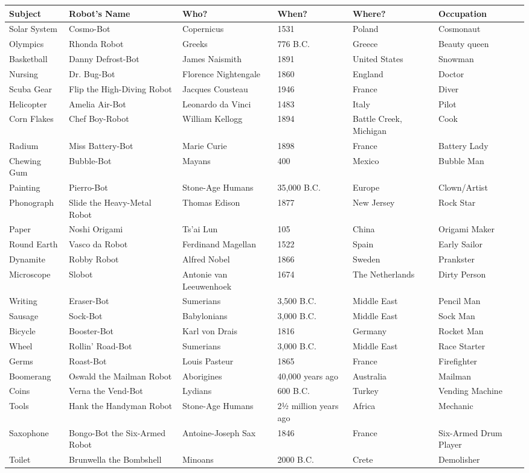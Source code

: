 \documentclass{article}
\begin{document}
\begin{tabular}{llllll}
\toprule
Subject & Robot's Name & Who? & When? & Where? & Occupation \\
\midrule
Solar System & Cosmo-Bot & Copernicus & 1531 & Poland & Cosmonaut \\
Olympics & Rhonda Robot & Greeks & 776 B.C. & Greece & Beauty queen \\
Basketball & Danny Defrost-Bot & James Naismith & 1891 & United States & Snowman \\
Nursing & Dr. Bug-Bot & Florence Nightengale & 1860 & England & Doctor \\
Scuba Gear & Flip the High-Diving Robot & Jacques Cousteau & 1946 & France & Diver \\
Helicopter & Amelia Air-Bot & Leonardo da Vinci & 1483 & Italy & Pilot \\
Corn Flakes & Chef Boy-Robot & William Kellogg & 1894 & Battle Creek, Michigan & Cook \\
Radium & Miss Battery-Bot & Marie Curie & 1898 & France & Battery Lady \\
Chewing Gum & Bubble-Bot & Mayans & 400 & Mexico & Bubble Man \\
Painting & Pierro-Bot & Stone-Age Humans & 35,000 B.C. & Europe & Clown/Artist \\
Phonograph & Slide the Heavy-Metal Robot & Thomas Edison & 1877 & New Jersey & Rock Star \\
Paper & Noshi Origami & Ts'ai Lun & 105 & China & Origami Maker \\
Round Earth & Vasco da Robot & Ferdinand Magellan & 1522 & Spain & Early Sailor \\
Dynamite & Robby Robot & Alfred Nobel & 1866 & Sweden & Prankster \\
Microscope & Slobot & Antonie van Leeuwenhoek & 1674 & The Netherlands & Dirty Person \\
Writing & Eraser-Bot & Sumerians & 3,500 B.C. & Middle East & Pencil Man \\
Sausage & Sock-Bot & Babylonians & 3,000 B.C. & Middle East & Sock Man \\
Bicycle & Booster-Bot & Karl von Drais & 1816 & Germany & Rocket Man \\
Wheel & Rollin' Road-Bot & Sumerians & 3,000 B.C. & Middle East & Race Starter \\
Germs & Roast-Bot & Louis Pasteur & 1865 & France & Firefighter \\
Boomerang & Oswald the Mailman Robot & Aborigines & 40,000 years ago & Australia & Mailman \\
Coins & Verna the Vend-Bot & Lydians & 600 B.C. & Turkey & Vending Machine \\
Tools & Hank the Handyman Robot & Stone-Age Humans & 2½ million years ago & Africa & Mechanic \\
Saxophone & Bongo-Bot the Six-Armed Robot & Antoine-Joseph Sax & 1846 & France & Six-Armed Drum Player \\
Toilet & Brunwella the Bombshell & Minoans & 2000 B.C. & Crete & Demolisher \\
\bottomrule
\end{tabular}
\end{document}
